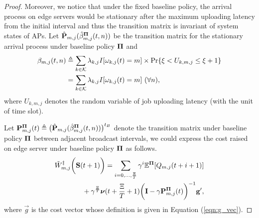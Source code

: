 \begin{proof}
    Moreover, we notice that under the fixed baseline policy, the arrival process on edge servers would be stationary after the maximum uploading latency from the initial interval and thus the transition matrix is invariant of system states of APs.
    Let $\hat{\mathbf{P}}_{m,j}(\hat{\beta}^{\mathbf{\Pi}}_{m,j}(t,n))$ be the transition matrix for the stationary arrival process under baseline policy $\mathbf{\Pi}$ and
    \begin{align}
        \beta_{m,j}(t,n) &\define \sum_{k\in\apSet} \lambda_{k,j}I[\omega_{k,j}(t)=m] \times \Pr\{ \xi<U_{k,m,j}\le\xi+1 \}
        \nonumber\\
        &= \sum_{k\in\apSet} \lambda_{k,j}I[\omega_{k,j}(t)=m]\ (\forall n),
    \end{align}
    where $U_{k,m,j}$ denotes the random variable of job uploading latency (with the unit of time slot).

    Let
    $\mathbf{P}^{\mathbf{\Pi}}_{m,j}(t) \triangleq \big( \hat{\mathbf{P}}_{m,j}(\hat{\beta}^{\mathbf{\Pi}}_{m,j}(t,n)) \big)^{t_B}$
    denote the transition matrix under baseline policy $\mathbf{\Pi}$ between adjacent broadcast intervals, we could express the cost raised on edge server under baseline policy $\mathbf{\Pi}$ as follows.
    \begin{align}
        &\tilde{W}^{\ddagger}_{m,j}\bigg(\mathbf{S}(t+1)\bigg)
        = \sum_{i=0,\dots,\frac{\Xi}{T}} \gamma^{i} \mathbb{E}^{\mathbf{\Pi}}[ Q_{m,j}({t+i+1}) ]
        \nonumber\\
        &~~~~~~~~~~~~+ \gamma^{\frac{\Xi}{T}} 
        \boldsymbol{\nu}({t+\frac{\Xi}{T}+1})
        \bigg(
            \mathbf{I} - \gamma \mathbf{P}^{\mathbf{\Pi}}_{m,j}(t)
        \bigg)^{-1} \mathbf{g}',
    \end{align} 
    where $\vec{g}$ is the cost vector whose definition is given in Equation (\ref{eqn:g_vec}).
\end{proof}

